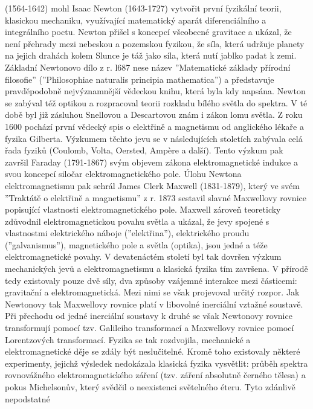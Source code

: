    (1564-1642) mohl Isaac Newton (1643-1727) vytvořit první fyzikální teorii, klasickou mechaniku,   
    využívající matematický aparát diferenciálního a integrálního poctu. Newton přišel s koncepcí   
    všeobecné gravitace a ukázal, že není přehrady mezi nebeskou a pozemskou fyzikou, že síla, která    
    udržuje planety na jejich drahách kolem Slunce je táž jako síla, která nutí jablko padat k zemi. 
    Základní Newtonovo dílo z r. l687 nese název ”Matematické základy přírodní filosofie” (”Philosophiae 
    naturalis principia mathematica”) a představuje pravděpodobně nejvýznamnější vědeckou knihu, která 
    byla kdy napsána. Newton se zabýval též optikou a rozpracoval teorii rozkladu bílého světla do 
    spektra. V té době byl již zásluhou Snellovou a Descartovou znám i zákon lomu světla. Z roku 1600 
    pochází první vědecký spis o elektřině a magnetismu od anglického lékaře a fyzika Gilberta. Výzkumem 
    těchto jevu se v následujících stoletích zabývala celá řada fyziků (Coulomb, Volta, Oersted, 
    Amp\`{e}re a další). Tento výzkum pak završil Faraday (1791-1867) svým objevem zákona 
    elektromagnetické indukce a svou koncepcí siločar elektromagnetického pole. Úlohu Newtona 
    elektromagnetismu pak sehrál James Clerk Maxwell (1831-1879), který ve svém ”Traktátě o elektřině a 
    magnetismu” z r. 1873 sestavil slavné Maxwellovy rovnice popisující vlastnosti elektromagnetického 
    pole. Maxwell zároveň teoreticky zdůvodnil elektromagnetickou povahu světla a ukázal, že jevy spojené 
    s vlastnostmi elektrického náboje (”elektřina”), elektrického proudu (”galvanismus”), magnetického 
    pole a světla (optika), jsou jedné a téže elektromagnetické povahy. V devatenáctém století byl tak 
    dovršen výzkum mechanických jevů a elektromagnetismu a klasická fyzika tím za\-vršena. V přírodě tedy 
    existovaly pouze dvě síly, dva způsoby vzájemné interakce mezi částicemi: gravitační a 
    elektromagnetická. Mezi nimi se však projevoval určitý rozpor. Jak Newtonovy tak Maxwellovy rovnice 
    platí v libovolné inerciální vztažné soustavě. Při přechodu od jedné inerciální soustavy k druhé se 
    však Newtonovy rovnice transformují pomocí tzv. Galileiho transformací a Maxwellovy rovnice pomocí 
    Lorentzových transformací. Fyzika se tak rozdvojila, mechanické a elektromagnetické děje se zdály být 
    neslučitelné. Kromě toho existovaly některé experimenty, jejichž výsledek nedokázala klasická fyzika 
    vysvětlit: průběh spektra rovnovážného elektromagnetického záření (tzv. záření absolutně černého 
    tělesa) a pokus Michelsonův, který svědčil o neexistenci světelného éteru. Tyto zdánlivě nepodstatné 
